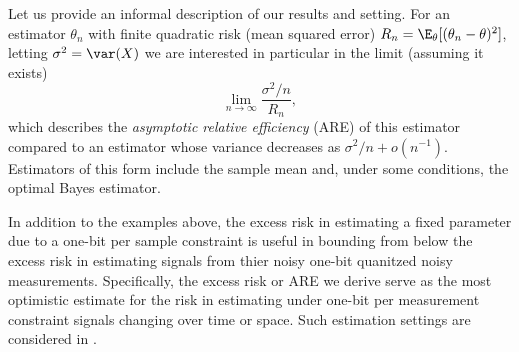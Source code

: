 Let us provide an informal description of our results and setting.  For an
estimator $\theta_n$ with finite quadratic risk (mean squared error) $R_n =
\E_\theta[(\theta_n - \theta)^2]$, letting $\sigma^2 = \var(X)$
we are interested in particular in the
limit (assuming it exists)
\begin{equation}
  \label{eq:ARE_def}
  \lim_{n\to \infty} \frac{\sigma^2/n}{R_n},
\end{equation}
which describes the \emph{asymptotic relative efficiency} (ARE) of this
estimator compared to an estimator whose variance decreases as
$\sigma^2/n+o(n^{-1})$. Estimators of this form include the sample mean
and, under some conditions, the optimal Bayes estimator.


In addition to the examples above, the excess risk in estimating a fixed parameter due to a one-bit per sample constraint is useful in bounding from below the excess risk in estimating signals from thier noisy one-bit quanitzed noisy measurements. Specifically, the excess risk or ARE we derive serve as the most optimistic estimate for the risk in estimating under one-bit per measurement constraint signals changing over time or space. Such estimation settings are considered in \cite{baraniuk2017exponential, jacques2013robust, plan2013one, li2017channel, choi2016near}. \par


